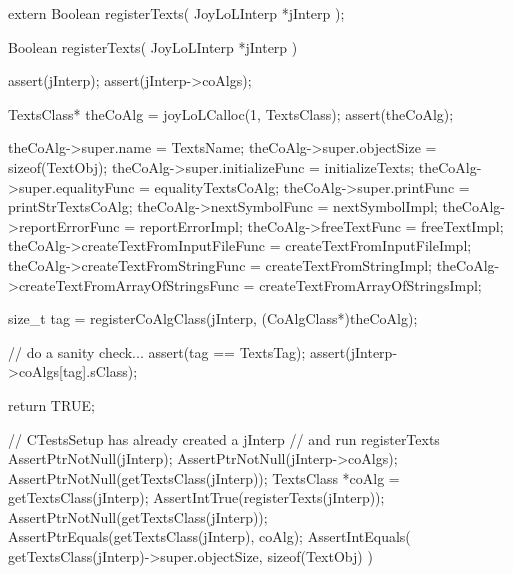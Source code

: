 \startCHeader
extern Boolean registerTexts(
  JoyLoLInterp *jInterp
);
\stopCHeader
{}

\startCCode
Boolean registerTexts(
  JoyLoLInterp *jInterp
) {
  assert(jInterp);
  assert(jInterp->coAlgs);
  
  TextsClass* theCoAlg = joyLoLCalloc(1, TextsClass);
  assert(theCoAlg);
  
  theCoAlg->super.name           = TextsName;
  theCoAlg->super.objectSize     = sizeof(TextObj);
  theCoAlg->super.initializeFunc = initializeTexts;
  theCoAlg->super.equalityFunc   = equalityTextsCoAlg;
  theCoAlg->super.printFunc      = printStrTextsCoAlg;
  theCoAlg->nextSymbolFunc       = nextSymbolImpl;
  theCoAlg->reportErrorFunc      = reportErrorImpl;
  theCoAlg->freeTextFunc         = freeTextImpl;
  theCoAlg->createTextFromInputFileFunc = 
    createTextFromInputFileImpl;
  theCoAlg->createTextFromStringFunc =
    createTextFromStringImpl;
  theCoAlg->createTextFromArrayOfStringsFunc =
    createTextFromArrayOfStringsImpl;

  size_t tag =
    registerCoAlgClass(jInterp, (CoAlgClass*)theCoAlg);
  
  // do a sanity check...
  assert(tag == TextsTag);
  assert(jInterp->coAlgs[tag].sClass);

  return TRUE;
}
\stopCCode


\startCTest
  // CTestsSetup has already created a jInterp
  // and run registerTexts
  AssertPtrNotNull(jInterp);
  AssertPtrNotNull(jInterp->coAlgs);
  AssertPtrNotNull(getTextsClass(jInterp));
  TextsClass *coAlg = getTextsClass(jInterp);
  AssertIntTrue(registerTexts(jInterp));
  AssertPtrNotNull(getTextsClass(jInterp));
  AssertPtrEquals(getTextsClass(jInterp), coAlg);
  AssertIntEquals(
    getTextsClass(jInterp)->super.objectSize,
    sizeof(TextObj)
  )
\stopCTest
\stopTestCase
\stopTestSuite
